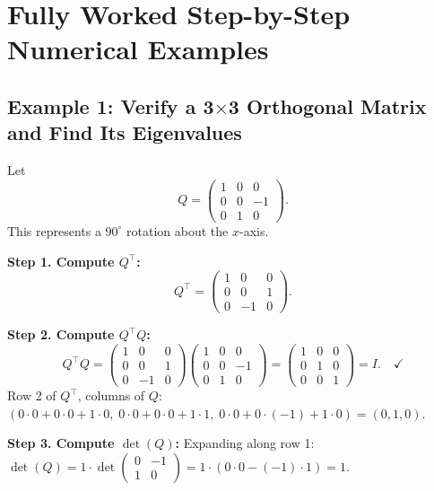 \documentclass[12pt,a4paper]{article}
\begin{document}
\section{Fully Worked Step-by-Step Numerical Examples}

\subsection*{Example 1: Verify a 3$\times$3 Orthogonal Matrix and Find Its Eigenvalues}

Let
\[
  Q = \begin{pmatrix}
    1 & 0 & 0 \\
    0 & 0 & -1 \\
    0 & 1 & 0
  \end{pmatrix}.
\]
This represents a $90^\circ$ rotation about the $x$-axis.

\textbf{Step 1. Compute $Q^\top$:}
\[
  Q^\top = \begin{pmatrix}
    1 & 0 & 0 \\
    0 & 0 & 1 \\
    0 & -1 & 0
  \end{pmatrix}.
\]

\textbf{Step 2. Compute $Q^\top Q$:}
\[
  Q^\top Q = \begin{pmatrix}
    1 & 0 & 0 \\
    0 & 0 & 1 \\
    0 & -1 & 0
  \end{pmatrix}
  \begin{pmatrix}
    1 & 0 & 0 \\
    0 & 0 & -1 \\
    0 & 1 & 0
  \end{pmatrix}
  = \begin{pmatrix}
    1 & 0 & 0 \\
    0 & 1 & 0 \\
    0 & 0 & 1
  \end{pmatrix} = I. \quad \checkmark
\]
Row 2 of $Q^\top$, columns of $Q$: $(0\cdot0 + 0\cdot0 + 1\cdot0,\; 0\cdot0+0\cdot0+1\cdot1,\; 0\cdot0+0\cdot(-1)+1\cdot0) = (0,1,0)$. \quad \checkmark

\textbf{Step 3. Compute $\det(Q)$:}
Expanding along row 1: $\det(Q) = 1 \cdot \det\begin{pmatrix}0&-1\\1&0\end{pmatrix} = 1 \cdot (0\cdot0 - (-1)\cdot1) = 1$. \quad \checkmark
\end{document}
